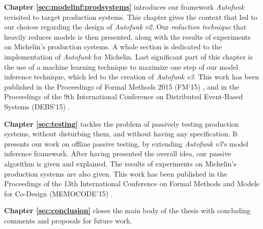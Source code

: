 \textbf{Chapter \ref{sec:modelinf:prodsystems}} introduces our
framework \textit{Autofunk} revisited to target production
systems. This chapter gives the context that led to our choices
regarding the design of \textit{Autofunk v2}. Our \emph{reduction
technique} that heavily reduces models is then presented, along
with the results of experiments on Michelin's production systems.
A whole section is dedicated to the implementation of
\textit{Autofunk} for Michelin. Last significant part of this
chapter is the use of a machine learning technique to maximize
one step of our model inference technique, which led to the
creation of \emph{Autofunk v3}. This work has been published in
the Proceedings of Formal Methods 2015 (FM'15)
\cite{DBLP:conf/fm/DurandS15}, and in the Proceedings of the 9th
International Conference on Distributed Event-Based Systems
(DEBS'15) \cite{DBLP:conf/debs/SalvaD15}.

\textbf{Chapter \ref{sec:testing}} tackles the problem of
passively testing production systems, without disturbing them,
and without having any specification. It presents our work on
offline passive testing, by extending \textit{Autofunk v3}'s
model inference framework. After having presented the overall
idea, our passive algorithm is given and explained. The results
of experiments on Michelin's production systems are also given.
This work has been published in the Proceedings of the 13th
International Conference on Formal Methods and Models for
Co-Design (MEMOCODE'15) \cite{7340480}.

\textbf{Chapter \ref{sec:conclusion}} closes the main body of the
thesis with concluding comments and proposals for future work.

\cleardoublepage
